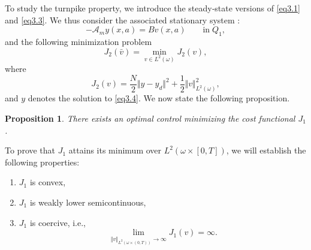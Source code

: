 \documentclass[10pt, a4]{amsart}
\theoremstyle{plain}
\newtheorem{proposition}[lemma]{Proposition}
\theoremstyle{definition}
\theoremstyle{remark}
\numberwithin{equation}{section}
\begin{document}
To study the turnpike property, we introduce the steady‑state versions of \eqref{eq3.1} and \eqref{eq3.3}. We thus consider the associated stationary system :
\begin{equation}\label{eq3.4}	 
-\mathcal{A}_m y(x,a)=Bv(x,a) \qquad\text{in}\; Q_1,
\end{equation}
and the following minimization problem 
\begin{equation}\label{eq3.5}
J_2(\bar{v})=\min_{v\in L^2(\omega)}J_2(v),
\end{equation}
where 
\begin{equation}\label{eq3.6}
J_2(v)=\frac{N}{2}\Vert y-y_d\Vert^2+\frac{1}{2}\Vert v\Vert^2_{L^2(\omega)},
\end{equation}
and $y$ denotes the solution to \eqref{eq3.4}.  We now state the following proposition.
\begin{proposition}\label{pr3.1}
There exists an optimal control minimizing the cost functional \(J_1\).
\end{proposition}
To prove that $J_1$ attains its minimum over $L^2(\omega \times [0,T])$, we will establish the following properties:
\begin{enumerate}
\item $J_1$ is convex,
\item \(J_1\)  is weakly lower semicontinuous,
\item \(J_1\) is coercive, i.e., $$\lim_{\Vert v\Vert_{L^2(\omega\times(0,T))} \longrightarrow\infty}J_1(v)=\infty.$$
\end{enumerate}
\end{document}
